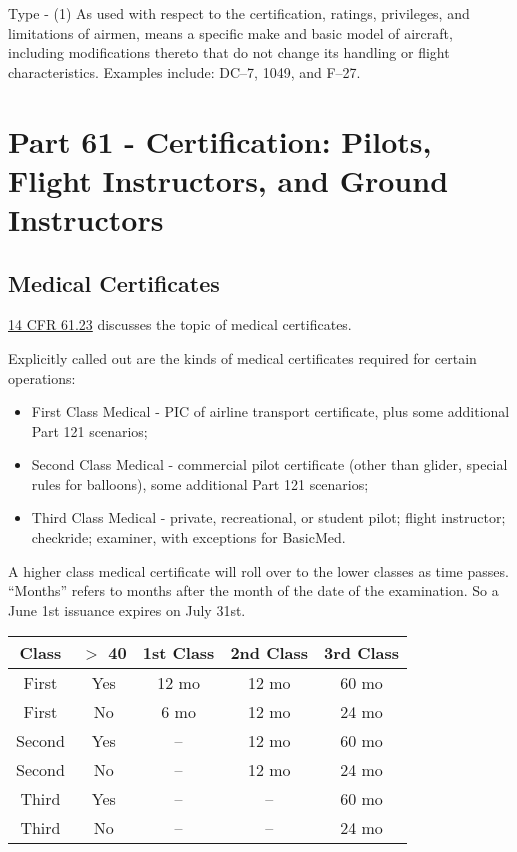 Type - (1) As used with respect to the certification, ratings, privileges, and limitations of airmen, means a specific make and basic model of aircraft, including modifications thereto that do not change its handling or flight characteristics. Examples include: DC–7, 1049, and F–27. 

\section{Part 61 - Certification: Pilots, Flight Instructors, and Ground Instructors}

\subsection{Medical Certificates}

\href{https://www.ecfr.gov/current/title-14/chapter-I/subchapter-D/part-61/subpart-A/section-61.23}{14 CFR 61.23} discusses the topic of medical certificates.

Explicitly called out are the kinds of medical certificates required for certain operations:

\begin{itemize}
\item First Class Medical - PIC of airline transport certificate, plus some additional Part 121 scenarios;
\item Second Class Medical - commercial pilot certificate (other than glider, special rules for balloons), some additional Part 121 scenarios;
\item Third Class Medical - private, recreational, or student pilot; flight instructor; checkride; examiner, with exceptions for BasicMed.
\end{itemize}

A higher class medical certificate will roll over to the lower classes as time passes. ``Months'' refers to months after the month of the date of the examination. So a June 1st issuance expires on July 31st.

\begin{center}
\begin{tabular}{ |c|c|c|c|c| }
\hline
Class & $>$ 40 & 1st Class & 2nd Class & 3rd Class \\
\hline
First & Yes      & 12 mo & 12 mo & 60 mo \\
First & No       &  6 mo & 12 mo & 24 mo \\
\hline
Second & Yes     & --        & 12 mo & 60 mo \\
Second & No      & --        & 12 mo & 24 mo \\
\hline
Third & Yes      & --        & --        & 60 mo \\
Third & No       & --        & --        & 24 mo \\
\hline
\end{tabular}
\end{center}



